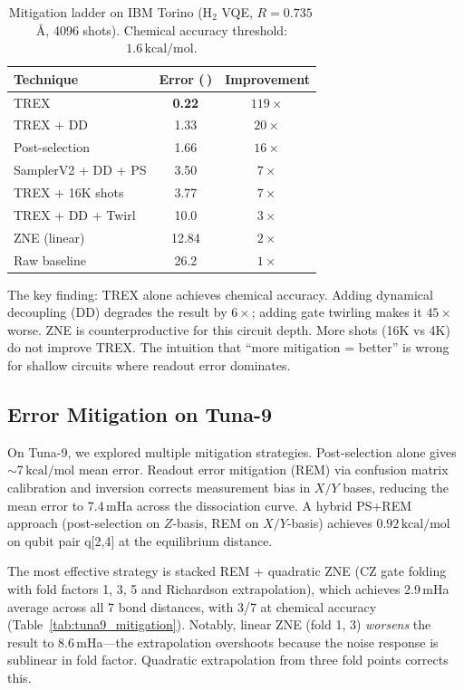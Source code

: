 \documentclass[twocolumn,prl,superscriptaddress,nofootinbib]{revtex4-2}
\newcommand{\kcalmol}{\,\text{kcal/mol}}
\begin{document}
\begin{table}[h]
\caption{Mitigation ladder on IBM Torino (H$_2$ VQE, $R = 0.735$\,\AA, 4096 shots). Chemical accuracy threshold: $1.6\kcalmol$.}
\label{tab:mitigation}
\begin{ruledtabular}
\begin{tabular}{lcc}
Technique & Error (\kcalmol) & Improvement \\
\midrule
TREX & \textbf{0.22} & $119\times$ \\
TREX + DD & 1.33 & $20\times$ \\
Post-selection & 1.66 & $16\times$ \\
SamplerV2 + DD + PS & 3.50 & $7\times$ \\
TREX + 16K shots & 3.77 & $7\times$ \\
TREX + DD + Twirl & 10.0 & $3\times$ \\
ZNE (linear) & 12.84 & $2\times$ \\
Raw baseline & 26.2 & $1\times$ \\
\end{tabular}
\end{ruledtabular}
\end{table}

The key finding: TREX alone achieves chemical accuracy. Adding dynamical decoupling (DD) degrades the result by $6\times$; adding gate twirling makes it $45\times$ worse. ZNE is counterproductive for this circuit depth. More shots (16K vs 4K) do not improve TREX. The intuition that ``more mitigation = better'' is wrong for shallow circuits where readout error dominates.

\subsection{Error Mitigation on Tuna-9}

On Tuna-9, we explored multiple mitigation strategies.
Post-selection alone gives $\sim$7$\kcalmol$ mean error. Readout error mitigation (REM) via confusion matrix calibration and inversion corrects measurement bias in $X/Y$ bases, reducing the mean error to 7.4\,mHa across the dissociation curve.
A hybrid PS+REM approach (post-selection on $Z$-basis, REM on $X/Y$-basis) achieves $0.92\kcalmol$ on qubit pair q[2,4] at the equilibrium distance.

The most effective strategy is stacked REM + quadratic ZNE (CZ gate folding with fold factors 1, 3, 5 and Richardson extrapolation), which achieves 2.9\,mHa average across all 7 bond distances, with 3/7 at chemical accuracy (Table~\ref{tab:tuna9_mitigation}).
Notably, linear ZNE (fold 1, 3) \emph{worsens} the result to 8.6\,mHa---the extrapolation overshoots because the noise response is sublinear in fold factor.
Quadratic extrapolation from three fold points corrects this.
\end{document}
